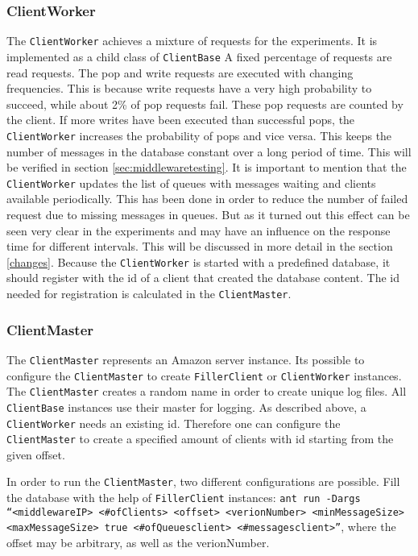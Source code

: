 \documentclass[
10pt, %
a4paper, %
oneside, %
headinclude,footinclude, %
BCOR5mm, %
]{scrartcl}
\begin{document}
\subsubsection{ClientWorker}
The \texttt{ClientWorker} achieves a mixture of requests for the experiments. It is implemented as a child class of \texttt{ClientBase} A fixed percentage of requests are read requests. The pop and write requests are executed with changing frequencies. This is because write requests have a very high probability to succeed, while about 2\% of pop requests fail. These pop requests are counted by the client. If more writes have been executed than successful pops, the \texttt{ClientWorker} increases the probability of pops and vice versa. This keeps the number of messages in the database constant over a long period of time. This will be verified in section \vref{sec:middlewaretesting}. It is important to mention that the \texttt{ClientWorker} updates the list of queues with messages waiting and clients available periodically. This has been done in order to reduce the number of failed request due to missing messages in queues. But as it turned out this effect can be seen very clear in the experiments and may have an influence on the response time for different intervals. This will be discussed in more detail in the section \vref{changes}.
Because the \texttt{ClientWorker} is started with a predefined database, it should register with the id of a client that created the database content. The id needed for registration is calculated in the \texttt{ClientMaster}.

\subsubsection{ClientMaster}
The \texttt{ClientMaster} represents an Amazon server instance. Its possible to configure the \texttt{ClientMaster} to create \texttt{FillerClient} or \texttt{ClientWorker} instances. The \texttt{ClientMaster} creates a random name in order to create unique log files. All \texttt{ClientBase} instances use their master for logging. As described above, a \texttt{ClientWorker} needs an existing id. Therefore one can configure the \texttt{ClientMaster} to create a specified amount of clients with id starting from the given offset.

In order to run the \texttt{ClientMaster}, two different configurations are possible. 
Fill the database with the help of \texttt{FillerClient} instances:
\texttt{ant run -Dargs ``<middlewareIP> <\#ofClients> <offset> <verionNumber> <minMessageSize> <maxMessageSize> true <\#ofQueues\/client> <\#messages\/client>''}, where the offset may be arbitrary, as well as the verionNumber.
\end{document}
